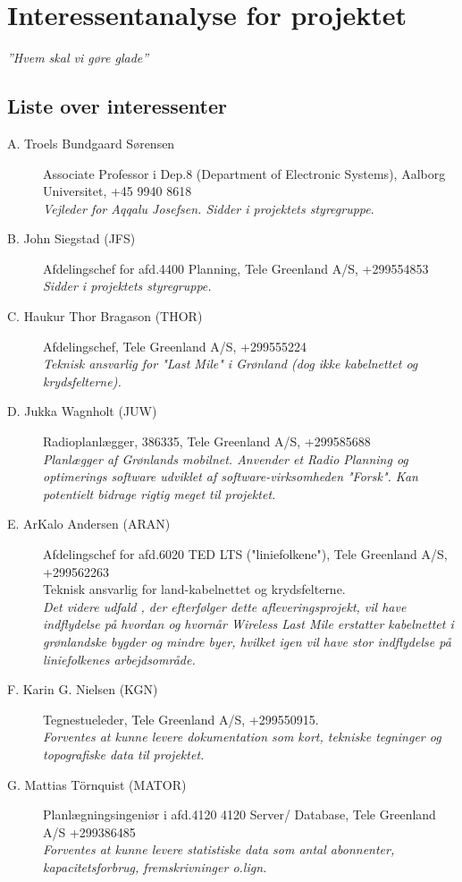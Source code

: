 \section{Interessentanalyse for projektet}
\emph{''Hvem skal vi gøre glade''}

\subsection{Liste over interessenter}

\begin{description}
 \item [A. Troels Bundgaard Sørensen] Associate Professor i Dep.8 (Department of Electronic Systems), Aalborg Universitet, +45 9940 8618\\
  \emph{Vejleder for Aqqalu Josefsen. Sidder i projektets styregruppe}.
 \item [B. John Siegstad (JFS)] Afdelingschef for afd.4400 Planning, Tele Greenland A/S, +299554853\\
 \emph{Sidder i projektets styregruppe.}
 \item [C. Haukur Thor Bragason (THOR)] Afdelingschef, Tele Greenland A/S, +299555224\\
  \emph{Teknisk ansvarlig for "Last Mile" i Grønland (dog ikke kabelnettet og krydsfelterne).}
 \item [D. Jukka Wagnholt (JUW)] Radioplanlægger, 386335, Tele Greenland A/S, +299585688\\
 \emph{Planlægger af Grønlands mobilnet. Anvender et Radio Planning og optimerings software udviklet af software-virksomheden "Forsk". Kan potentielt bidrage rigtig meget til projektet.}
 \item [E. ArKalo Andersen (ARAN)] Afdelingschef for afd.6020 TED LTS ("liniefolkene"), Tele Greenland A/S, +299562263\\
  Teknisk ansvarlig for land-kabelnettet og krydsfelterne.\\
  \emph{Det videre udfald , der efterfølger dette afleveringsprojekt, vil have indflydelse på hvordan og hvornår Wireless Last Mile erstatter kabelnettet i grønlandske bygder og mindre byer, hvilket igen vil have stor indflydelse på liniefolkenes arbejdsområde.}
  \item [F. Karin G. Nielsen (KGN)] Tegnestueleder, Tele Greenland A/S, +299550915.\\
   \emph{Forventes at kunne levere dokumentation som kort, tekniske tegninger og topografiske data til projektet.}
  \item[G. Mattias Törnquist (MATOR)] Planlægningsingeniør i afd.4120 4120 Server/ Database, Tele Greenland A/S +299386485\\
   \emph{Forventes at kunne levere statistiske data som antal abonnenter, kapacitetsforbrug, fremskrivninger o.lign.} 
\end{description}



